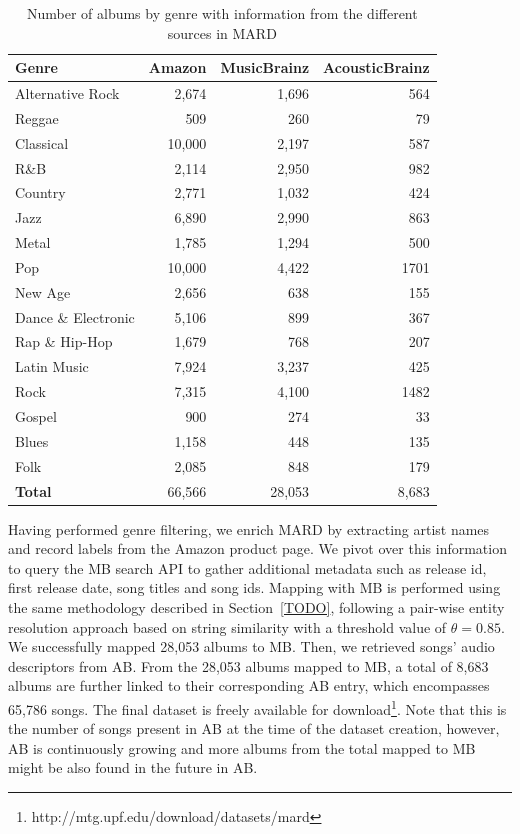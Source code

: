 \begin{table}[h]
\scriptsize
\centering
\begin{tabular}{|l|r|r|r|}
\hline
\textbf{Genre} & \textbf{Amazon} & \textbf{MusicBrainz} & \textbf{AcousticBrainz} \\
\hline
Alternative Rock & 2,674 & 1,696 & 564 \\
Reggae & 509 & 260 & 79 \\
Classical & 10,000 & 2,197 & 587 \\
R\&B & 2,114 & 2,950 & 982 \\
Country & 2,771 & 1,032 & 424 \\
Jazz & 6,890 & 2,990 & 863 \\
Metal & 1,785 & 1,294 & 500 \\
Pop & 10,000 & 4,422 & 1701 \\
New Age & 2,656 & 638 & 155 \\
Dance \& Electronic & 5,106 & 899 & 367 \\
Rap \& Hip-Hop & 1,679 & 768 & 207 \\
Latin Music & 7,924 & 3,237 & 425 \\
Rock & 7,315 & 4,100 & 1482 \\
Gospel & 900 & 274 & 33 \\
Blues & 1,158 & 448 & 135 \\
Folk & 2,085 & 848 & 179 \\
\hline
\textbf{Total} & 66,566 & 28,053 & 8,683 \\
\hline
\end{tabular}
\caption{Number of albums by genre with information from the different sources in MARD}
\label{tbl:musicology:dataset}
\end{table}

Having performed genre filtering, we enrich MARD by extracting artist names and record labels from the Amazon product page. We pivot over this information to query the MB search API to gather additional metadata such as release id, first release date, song titles and song ids. Mapping with MB is performed using the same methodology described in Section~\ref{TODO}, following a pair-wise entity resolution approach based on string similarity with a threshold value of $\theta=0.85$. We successfully mapped 28,053 albums to MB. Then, we retrieved songs' audio descriptors from AB. From the 28,053 albums mapped to MB, a total of 8,683 albums are further linked to their corresponding AB entry, which encompasses 65,786 songs. The final dataset is freely available for download\footnote{http://mtg.upf.edu/download/datasets/mard}.
Note that this is the number of songs present in AB at the time of the dataset creation, however, AB is continuously growing and more albums from the total mapped to MB might be also found in the future in AB. %

